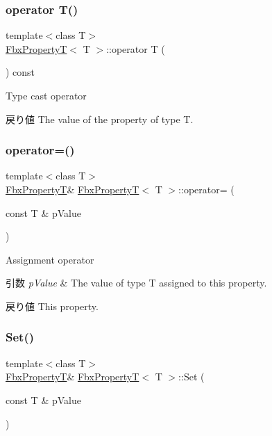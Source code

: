 \subsubsection{\texorpdfstring{operator T()}{operator T()}}
{\footnotesize\ttfamily template$<$class T$>$ \\
\hyperlink{class_fbx_property_t}{Fbx\+PropertyT}$<$ T $>$\+::operator T (\begin{DoxyParamCaption}{ }\end{DoxyParamCaption}) const}

Type cast operator \begin{DoxyReturn}{戻り値}
The value of the property of type T. 
\end{DoxyReturn}
\mbox{\label{class_fbx_property_t_a6334bf20dd8536b5a275c9cfabfa1a67}} 
\subsubsection{\texorpdfstring{operator=()}{operator=()}}
{\footnotesize\ttfamily template$<$class T$>$ \\
\hyperlink{class_fbx_property_t}{Fbx\+PropertyT}\& \hyperlink{class_fbx_property_t}{Fbx\+PropertyT}$<$ T $>$\+::operator= (\begin{DoxyParamCaption}\item[{const T \&}]{p\+Value }\end{DoxyParamCaption})}

Assignment operator 
\begin{DoxyParams}{引数}
{\em p\+Value} & The value of type T assigned to this property. \\
\hline
\end{DoxyParams}
\begin{DoxyReturn}{戻り値}
This property. 
\end{DoxyReturn}
\mbox{\label{class_fbx_property_t_a7245e9041d26955a5c2f31fc40b63228}} 
\subsubsection{\texorpdfstring{Set()}{Set()}}
{\footnotesize\ttfamily template$<$class T$>$ \\
\hyperlink{class_fbx_property_t}{Fbx\+PropertyT}\& \hyperlink{class_fbx_property_t}{Fbx\+PropertyT}$<$ T $>$\+::Set (\begin{DoxyParamCaption}\item[{const T \&}]{p\+Value }\end{DoxyParamCaption})}

